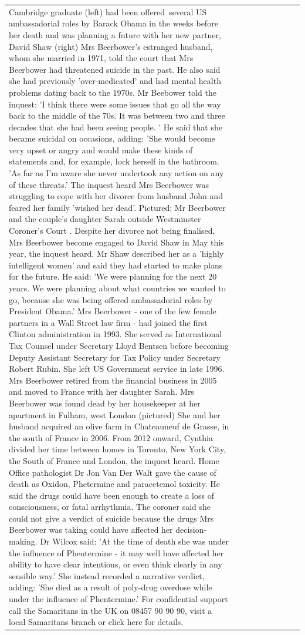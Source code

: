 \begin{table}[H]
\begin{tabular}{lllrlllll}
Cambridge graduate (left) had been offered several US ambassadorial roles by Barack Obama in the weeks before her death and was planning a future with her new partner, David Shaw (right) Mrs Beerbower's estranged husband, whom she married in 1971, told the court that Mrs Beerbower had threatened suicide in the past. He also said she had previously 'over-medicated' and had mental health problems dating back to the 1970s. Mr Beebower told the inquest: 'I think there were some issues that go all the way back to the middle of the 70s. It was between two and three decades that she had been seeing people. ' He said that she became suicidal on occasions, adding: 'She would become very upset or angry and would make these kinds of statements and, for example, lock herself in the bathroom. 'As far as I'm aware she never undertook any action on any of these threats.' The inquest heard Mrs Beerbower was struggling to cope with her divorce from husband John and feared her family 'wished her dead'. Pictured: Mr Beerbower and the couple's daughter Sarah outside Westminster Coroner's Court . Despite her divorce not being finalised, Mrs Beerbower become engaged to David Shaw in May this year, the inquest heard. Mr Shaw described her as a 'highly intelligent women' and said they had started to make plans for the future. He said: 'We were planning for the next 20 years. We were planning about what countries we wanted to go, because she was being offered ambassadorial roles by President Obama.' Mrs Beerbower - one of the few female partners in a Wall Street law firm - had joined the first Clinton administration in 1993. She served as International Tax Counsel under Secretary Lloyd Bentsen before becoming Deputy Assistant Secretary for Tax Policy under Secretary Robert Rubin. She left US Government service in late 1996. Mrs Beerbower retired from the financial business in 2005 and moved to France with her daughter Sarah. Mrs Beerbower was found dead by her housekeeper at her apartment in Fulham, west London (pictured) She and her husband acquired an olive farm in Chateauneuf de Grasse, in the south of France in 2006. From 2012 onward, Cynthia divided her time between homes in Toronto, New York City, the South of France and London, the inquest heard. Home Office pathologist Dr Jon Van Der Walt gave the cause of death as Oxidon, Phetermine and paracetemol toxicity. He said the drugs could have been enough to create a loss of consciousness, or fatal arrhythmia. The coroner said she could not give a verdict of suicide because the drugs Mrs Beerbower was taking could have affected her decision-making. Dr Wilcox said: 'At the time of death she was under the influence of Phentermine - it may well have affected her ability to have clear intentions, or even think clearly in any sensible way.' She instead recorded a narrative verdict, adding: 'She died as a result of poly-drug overdose while under the influence of Phentermine.' For confidential support call the Samaritans in the UK on 08457 90 90 90, visit a local Samaritans branch or click here for details.

\end{tabular}
\end{table}
